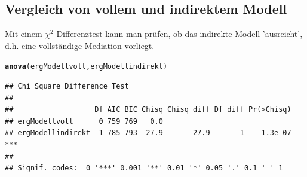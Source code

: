 \documentclass[a4paper]{article}\usepackage[]{graphicx}\usepackage[]{color}
\makeatletter
\newcommand{\hlstd}[1]{\textcolor[rgb]{0.345,0.345,0.345}{#1}}%
\newcommand{\hlkwd}[1]{\textcolor[rgb]{0.737,0.353,0.396}{\textbf{#1}}}%
\newenvironment{kframe}{%
 \def\at@end@of@kframe{}%
 \ifinner\ifhmode%
  \def\at@end@of@kframe{\end{minipage}}%
  \begin{minipage}{\columnwidth}%
 \fi\fi%
 \def\FrameCommand##1{\hskip\@totalleftmargin \hskip-\fboxsep
 \colorbox{shadecolor}{##1}\hskip-\fboxsep
     \hskip-\linewidth \hskip-\@totalleftmargin \hskip\columnwidth}%
 \MakeFramed {\advance\hsize-\width
   \@totalleftmargin\z@ \linewidth\hsize
   \@setminipage}}%
 {\par\unskip\endMakeFramed%
 \at@end@of@kframe}
\newenvironment{knitrout}{}{} %
\makeatother
\begin{document}
\subsection{Vergleich von vollem und indirektem Modell}
Mit einem $\chi^{2}$ Differenztest kann man pr\"ufen, ob das indirekte Modell 'ausreicht', d.h. eine vollständige Mediation vorliegt.
\begin{knitrout}
\color{fgcolor}\begin{kframe}
\begin{alltt}
\hlkwd{anova}\hlstd{(ergModellvoll,ergModellindirekt)}
\end{alltt}
\begin{verbatim}
## Chi Square Difference Test
## 
##                   Df AIC BIC Chisq Chisq diff Df diff Pr(>Chisq)    
## ergModellvoll      0 759 769   0.0                                  
## ergModellindirekt  1 785 793  27.9       27.9       1    1.3e-07 ***
## ---
## Signif. codes:  0 '***' 0.001 '**' 0.01 '*' 0.05 '.' 0.1 ' ' 1
\end{verbatim}
\end{kframe}
\end{knitrout}
\end{document}
